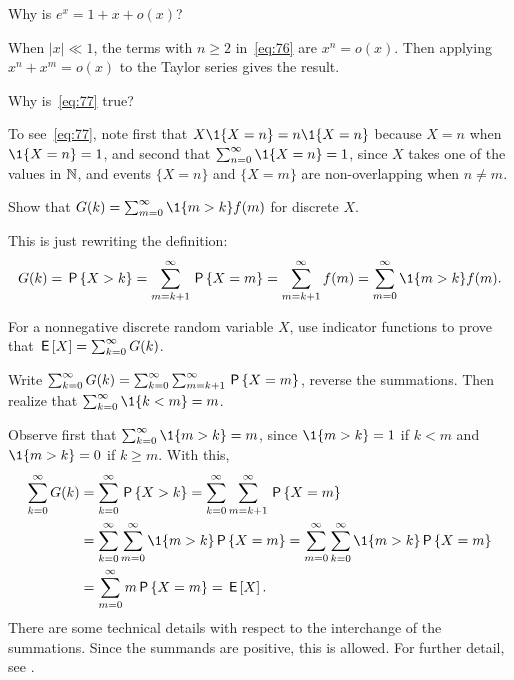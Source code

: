 \documentclass[queueing-book]{subfiles}
\begin{document}
\begin{exercise}\label{ex:87}
 Why is $e^{x} = 1 +x + o(x)$?
\begin{solution}
 When $|x|\ll 1$, the terms with $n\geq 2$ in~\cref{eq:76} are $x^n = o(x)$. Then applying $x^n + x^m = o(x)$ to the Taylor series gives the result.
\end{solution}
\end{exercise}

\begin{exercise}
 Why is~\cref{eq:77} true?
\begin{solution}
To see~\cref{eq:77}, note first that $X\1{X=n} = n\1{X=n}$ because $X=n$ when $\1{X=n} =1$, and second that $\sum_{n=0}^\infty \1{X=n} =1$, since $X$ takes one of the values in $\N$, and events $\{X=n\}$ and $\{X=m\}$ are non-overlapping when $n\neq m$.
\end{solution}
\end{exercise}

\begin{exercise}\label{ex:l-105}
Show that $G(k) = \sum_{m=0}^\infty \1{m>k} f(m)$ for discrete $X$.
\begin{solution}
 This is just rewriting the definition:
\begin{equation*}
G(k) = \P{X>k} = \sum_{m=k+1}^\infty \P{X=m} = \sum_{m=k+1}^\infty f(m)=\sum_{m=0}^\infty \1{m>k}f(m).
\end{equation*}
\end{solution}
\end{exercise}

\begin{exercise}\label{ex:6}
 For a nonnegative discrete random variable $X$, use indicator functions to prove that $\E X = \sum_{k=0}^\infty G(k)$.
\begin{hint}
Write
$\sum_{k=0}^\infty G(k) = \sum_{k=0}^\infty \sum_{m=k+1}^\infty \P{X=m}$, reverse the summations. Then realize that $\sum_{k=0}^\infty \1{k<m} = m$.
\end{hint}
\begin{solution}
Observe first that $\sum_{k=0}^\infty \1{m>k} = m$, since $\1{m>k}=1$ if $k<m$ and $\1{m>k} = 0$ if $k\geq m$. With this,
\begin{align*}
\sum_{k=0}^\infty G(k)
&= \sum_{k=0}^\infty \P{X>k}
= \sum_{k=0}^\infty \sum_{m=k+1}^\infty \P{X=m} \\
& = \sum_{k=0}^\infty \sum_{m=0}^\infty \1{m>k} \P{X=m}
= \sum_{m=0}^\infty \sum_{k=0}^\infty \1{m>k} \P{X=m} \\
&= \sum_{m=0}^\infty m\P{X=m} = \E X.
\end{align*}
There are some technical details with respect to the interchange of the summations.
Since the summands are positive, this is allowed.
For further detail, see \citet{capinski03:_probab_probl}.
\end{solution}
\end{exercise}
\end{document}

